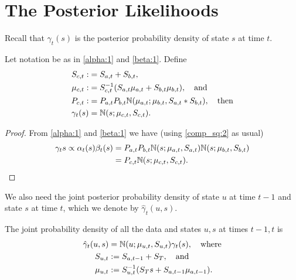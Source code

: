 \documentclass[12pt,leqno]{article}
\begin{document}
\section{The Posterior Likelihoods}
Recall that $\gamma_t(s)$ is the posterior probability density of state $s$
at time $t$. 
\begin{Thm}
  Let notation be as in \eqref{alpha:1} and \eqref{beta:1}.  Define
\begin{align*}
  S_{c,t} :&= S_{a,t} + S_{b,t}, \\
  \mu_{c,t} :&= S_{c,t}^{-1}(S_{a,t}\mu_{a,t} + S_{b,t}\mu_{b,t}), \quad\text{and}\\
  P_{c,t} :&= P_{a,t}P_{b,t}{\mathbb N}(\mu_{a,t};\mu_{b,t},S_{a,t}*S_{b,t}), \quad\text{then} \\
 \gamma_t(s) &= {\mathbb N}(s;\mu_{c,t},S_{c,t}).
  \end{align*}
\end{Thm}
\begin{proof}
  From \eqref{alpha:1} and \eqref{beta:1} we have (using \eqref{comp_sq:2}
  as usual)
  \begin{align*}
  \gamma_t{s} \propto \alpha_t(s)\beta_t(s) &= P_{a,t}P_{b,t}{\mathbb N}(s;\mu_{a,t},S_{a,t}){\mathbb N}(s;\mu_{b,t},S_{b,t})\\
  &= P_{c,t}{\mathbb N}(s;\mu_{c,t},S_{c,t}).
  \end{align*}
\end{proof}

We also need the joint posterior probability density of state $u$ at time $t-1$ and state $s$ at time $t$,
which we denote by $\hat{\gamma}_t(u,s)$.
\begin{Lem}\label{gamma_hat}
The joint probability density of all the data and states $u,s$  at times $t-1,t$ is
\begin{align*}
  \hat{\gamma}_t(u,s) &= {\mathbb N}(u;\mu_{u,t},S_{u,t})\gamma_t(s), \quad\text{where} \\
  S_{u,t} &:= S_{a,t-1}+S_T,\quad\text{and}\\
  \mu_{u,t} &:= S_{u,t}^{-1}(S_Ts + S_{a,t-1}\mu_{a,t-1}).
\end{align*}
\end{Lem}
\end{document}
